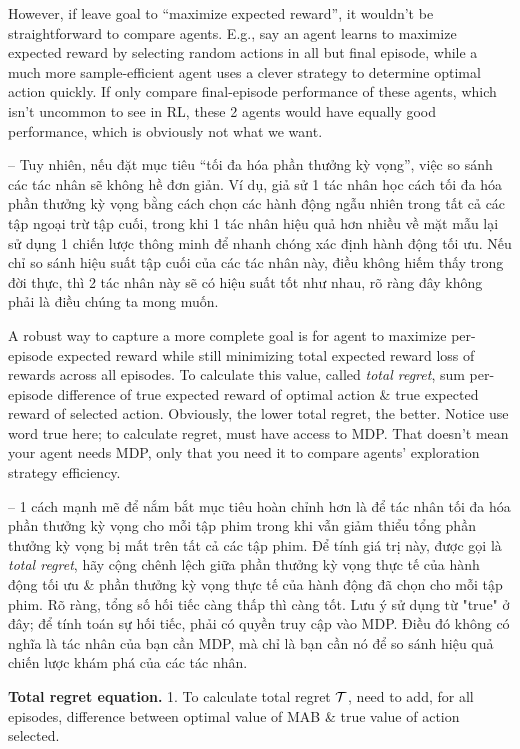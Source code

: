 \documentclass{article}
\begin{document}
\begin{itemize}
\begin{itemize}
\begin{itemize}
            However, if leave goal to ``maximize expected reward'', it wouldn't be straightforward to compare agents. E.g., say an agent learns to maximize expected reward by selecting random actions in all but final episode, while a much more sample-efficient agent uses a clever strategy to determine optimal action quickly. If only compare final-episode performance of these agents, which isn't uncommon to see in RL, these 2 agents would have equally good performance, which is obviously not what we want.

            -- Tuy nhiên, nếu đặt mục tiêu ``tối đa hóa phần thưởng kỳ vọng'', việc so sánh các tác nhân sẽ không hề đơn giản. Ví dụ, giả sử 1 tác nhân học cách tối đa hóa phần thưởng kỳ vọng bằng cách chọn các hành động ngẫu nhiên trong tất cả các tập ngoại trừ tập cuối, trong khi 1 tác nhân hiệu quả hơn nhiều về mặt mẫu lại sử dụng 1 chiến lược thông minh để nhanh chóng xác định hành động tối ưu. Nếu chỉ so sánh hiệu suất tập cuối của các tác nhân này, điều không hiếm thấy trong đời thực, thì 2 tác nhân này sẽ có hiệu suất tốt như nhau, rõ ràng đây không phải là điều chúng ta mong muốn.

            A robust way to capture a more complete goal is for agent to maximize per-episode expected reward while still minimizing total expected reward loss of rewards across all episodes. To calculate this value, called {\it total regret}, sum per-episode difference of true expected reward of optimal action \& true expected reward of selected action. Obviously, the lower total regret, the better. Notice use word true here; to calculate regret, must have access to MDP. That doesn't mean your agent needs MDP, only that you need it to compare agents' exploration strategy efficiency.

            -- 1 cách mạnh mẽ để nắm bắt mục tiêu hoàn chỉnh hơn là để tác nhân tối đa hóa phần thưởng kỳ vọng cho mỗi tập phim trong khi vẫn giảm thiểu tổng phần thưởng kỳ vọng bị mất trên tất cả các tập phim. Để tính giá trị này, được gọi là {\it total regret}, hãy cộng chênh lệch giữa phần thưởng kỳ vọng thực tế của hành động tối ưu \& phần thưởng kỳ vọng thực tế của hành động đã chọn cho mỗi tập phim. Rõ ràng, tổng số hối tiếc càng thấp thì càng tốt. Lưu ý sử dụng từ "true" ở đây; để tính toán sự hối tiếc, phải có quyền truy cập vào MDP. Điều đó không có nghĩa là tác nhân của bạn cần MDP, mà chỉ là bạn cần nó để so sánh hiệu quả chiến lược khám phá của các tác nhân.

            {\bf Total regret equation.} 1. To calculate total regret $\cal T$, need to add, for all episodes, difference between optimal value of MAB \& true value of action selected.


\end{itemize}
\end{itemize}
\end{itemize}
\end{document}
